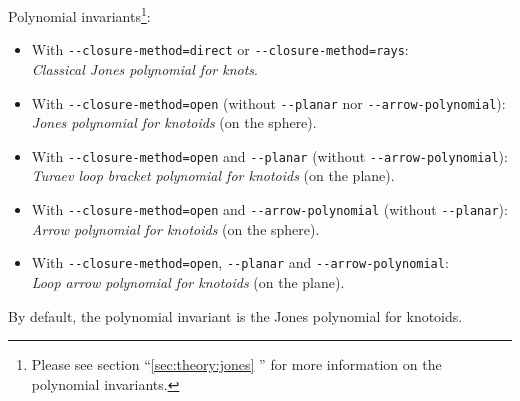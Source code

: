 Polynomial invariants\footnote{Please see section ``\ref{sec:theory:jones} '' for more information on the polynomial invariants.}:
\begin{itemize}
\item With \lstinline{--closure-method=direct} or  \lstinline{--closure-method=rays}:\\
  \emph{Classical Jones polynomial for knots}\cite{jones}.
\item With \lstinline{--closure-method=open} (without \lstinline{--planar} nor \lstinline{--arrow-polynomial}):\\
  \emph{Jones polynomial for knotoids} (on the sphere)\cite{turaev,guka}.
\item With \lstinline{--closure-method=open} and  \lstinline{--planar} (without \lstinline{--arrow-polynomial}):\\
  \emph{Turaev loop bracket polynomial for knotoids} (on the plane)\cite{turaev}.
\item With \lstinline{--closure-method=open} and \lstinline{--arrow-polynomial} (without \lstinline{--planar}):\\
  \emph{Arrow polynomial for knotoids} (on the sphere)\cite{guka,dye2009}.
\item With \lstinline{--closure-method=open}, \lstinline{--planar} and \lstinline{--arrow-polynomial}:\\
  \emph{Loop arrow polynomial for knotoids} (on the plane)\cite{gound2}.
\end{itemize}
By default, the polynomial invariant is the Jones polynomial for knotoids.

